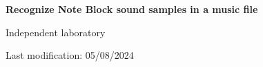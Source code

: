 
\begin{titlepage}
    \begin{center}
        \vspace*{1cm}
            
        \Huge
        \textbf{Recognize Note Block sound samples in a music file}
            
        \vspace{0.5cm}
        \LARGE
        Independent laboratory
            
        \vspace{2.5cm}
            
            
        \vfill
            
            
        \vspace{0.8cm}
            
            
        \Large
        Last modification: 05/08/2024
        \vspace*{1cm}
            
    \end{center}
\end{titlepage}
